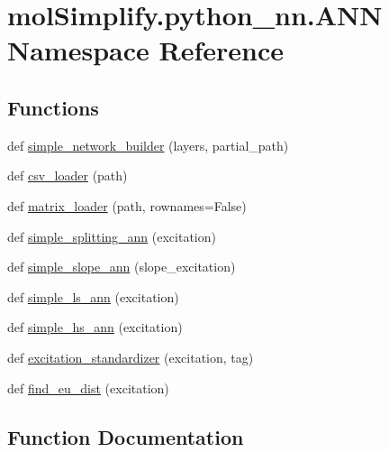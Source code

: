 \hypertarget{namespacemolSimplify_1_1python__nn_1_1ANN}{}\section{mol\+Simplify.\+python\+\_\+nn.\+A\+NN Namespace Reference}
\label{namespacemolSimplify_1_1python__nn_1_1ANN}
\subsection*{Functions}
\begin{DoxyCompactItemize}
\item 
def \hyperlink{namespacemolSimplify_1_1python__nn_1_1ANN_a6e5f76c45f7bc4b8870d0bd90d243745}{simple\+\_\+network\+\_\+builder} (layers, partial\+\_\+path)
\item 
def \hyperlink{namespacemolSimplify_1_1python__nn_1_1ANN_a60054250e8d689601729025a61536000}{csv\+\_\+loader} (path)
\item 
def \hyperlink{namespacemolSimplify_1_1python__nn_1_1ANN_a92990b14a11f215167fa93ac19dddf0e}{matrix\+\_\+loader} (path, rownames=False)
\item 
def \hyperlink{namespacemolSimplify_1_1python__nn_1_1ANN_a11cdc4405430d7f8619108550b7d16c3}{simple\+\_\+splitting\+\_\+ann} (excitation)
\item 
def \hyperlink{namespacemolSimplify_1_1python__nn_1_1ANN_a40aa6bf781d055d19ce750218bbc7a3c}{simple\+\_\+slope\+\_\+ann} (slope\+\_\+excitation)
\item 
def \hyperlink{namespacemolSimplify_1_1python__nn_1_1ANN_ac54b6d2b67cb4175b9c12c10a8bc3ef4}{simple\+\_\+ls\+\_\+ann} (excitation)
\item 
def \hyperlink{namespacemolSimplify_1_1python__nn_1_1ANN_ab8fb120aa7c98d9c2ba849cd06d4f902}{simple\+\_\+hs\+\_\+ann} (excitation)
\item 
def \hyperlink{namespacemolSimplify_1_1python__nn_1_1ANN_abcd14cf3f61af48111b124e4baf0262d}{excitation\+\_\+standardizer} (excitation, tag)
\item 
def \hyperlink{namespacemolSimplify_1_1python__nn_1_1ANN_aba3e52cd134cd43f5cee66ff48dc0564}{find\+\_\+eu\+\_\+dist} (excitation)
\end{DoxyCompactItemize}


\subsection{Function Documentation}
\mbox{\label{namespacemolSimplify_1_1python__nn_1_1ANN_a60054250e8d689601729025a61536000}} 
